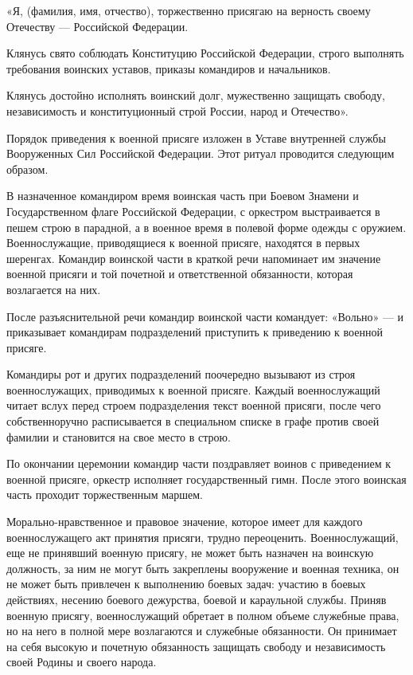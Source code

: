 \documentclass[12pt,a4paper]{report}
\begin{document}
  «Я, (фамилия, имя, отчество), торжественно присягаю на верность своему Отечеству — Российской Федерации.
  
  Клянусь свято соблюдать Конституцию Российской Федерации, строго выполнять требования воинских уставов, приказы командиров и начальников.
  
  Клянусь достойно исполнять воинский долг, мужественно защищать свободу, независимость и конституционный строй России, народ и Отечество».
  
  Порядок приведения к военной присяге изложен в Уставе внутренней службы Вооруженных Сил Российской Федерации. Этот ритуал проводится следующим образом.
  
  В назначенное командиром время воинская часть при Боевом Знамени и Государственном флаге Российской Федерации, с оркестром выстраивается в пешем строю в парадной, а в военное время в полевой форме одежды с оружием. Военнослужащие, приводящиеся к военной присяге, находятся в первых шеренгах. Командир воинской части в краткой речи напоминает им значение военной присяги и той почетной и ответственной обязанности, которая возлагается на них.
  
  После разъяснительной речи командир воинской части командует: «Вольно» — и приказывает командирам подразделений приступить к приведению к военной присяге.
  
  Командиры рот и других подразделений поочередно вызывают из строя военнослужащих, приводимых к военной присяге. Каждый военнослужащий читает вслух перед строем подразделения текст военной присяги, после чего собственноручно расписывается в специальном списке в графе против своей фамилии и становится на свое место в строю.
  
  По окончании церемонии командир части поздравляет воинов с приведением к военной присяге, оркестр исполняет государственный гимн. После этого воинская часть проходит торжественным маршем.
  
  Морально-нравственное и правовое значение, которое имеет для каждого военнослужащего акт принятия присяги, трудно переоценить. Военнослужащий, еще не принявший военную присягу, не может быть назначен на воинскую должность, за ним не могут быть закреплены вооружение и военная техника, он не может быть привлечен к выполнению боевых задач: участию в боевых действиях, несению боевого дежурства, боевой и караульной службы. Приняв военную присягу, военнослужащий обретает в полном объеме служебные права, но на него в полной мере возлагаются и служебные обязанности. Он принимает на себя высокую и почетную обязанность защищать свободу и независимость своей Родины и своего народа.
\end{document}
